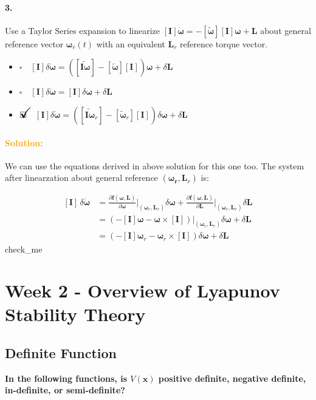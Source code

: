 \documentclass[12pt, a4paper]{article}
\newcommand{\ans}{\item[]$\rlap{\LARGE{\checkmark}}\square\quad$}
\newcommand{\noans}{\item[]$\square\quad$}
\begin{document}
\paragraph{3.}
Use a Taylor Series expansion to linearize $[\bm{I}]\dot{\bm{\omega}} = -[\tilde{\bm{\omega}}][\bm{I}]\bm{\omega} + \bm{L}$ about general reference vector $\bm{\omega}_{r}(t)$ with an equivalent $\bm{L}_{r}$ reference torque vector.

\begin{itemize}
\noans $[\bm{I}]\delta\dot{\bm{\omega}} = \left( [\widetilde{\bm{I}\bm{\omega}}] - [\tilde{\bm{\omega}}][\bm{I}] \right) \bm{\omega} + \delta \bm{L}$
\noans $[\bm{I}]\delta\dot{\bm{\omega}} =[\bm{I}]\delta\bm{\omega} + \delta \bm{L}$
\ans $[\bm{I}]\delta\dot{\bm{\omega}} = \left( [\widetilde{\bm{I}\bm{\omega}}_{r}] - [\tilde{\bm{\omega}}_{r}][\bm{I}] \right) \delta \bm{\omega} + \delta \bm{L}$
\end{itemize}  

\paragraph{\textcolor{orange}{Solution:}}
We can use the equations derived in above solution for this one too. The system after linearzation about general reference $(\bm{\bm{\omega}_{r}},\bm{L}_{r})$ is:

\begin{equation*}
    \begin{split}
        [\bm{I}]\,\delta\dot{\bm{\omega}}
        &=\frac{\partial\bm{f}(\bm{\omega},\bm{L})}{\partial \bm{\omega}}\biggr\rvert_{(\bm{\omega}_{r},\bm{L}_{r})}\delta\bm{\omega}+\frac{\partial\bm{f}(\bm{\omega},\bm{L})}{\partial\bm{L}}\biggr\rvert_{(\bm{\omega}_{r},\bm{L}_{r})}\delta\bm{L} \\
        &=\left(-[\bm{I}]\bm{\omega-\bm{\omega}\times[\bm{I}]}\right)\biggr\rvert_{(\bm{\omega}_{r},\bm{L}_{r})}\delta\bm{\omega} + \delta\bm{L}\\
        &= \left(-[\bm{I}]\bm{\omega}_{r}-\bm{\omega}_{r}\times[\bm{I}]\right)\delta\bm{\omega}+\delta\bm{L}
    \end{split}
\end{equation*}
check\_me

\newpage
\section{Week 2 - Overview of Lyapunov Stability Theory}
\subsection{Definite Function}
\textbf{In the following functions, is $V(\bm{x})$ positive definite, negative definite, in-definite, or semi-definite?}
\end{document}
